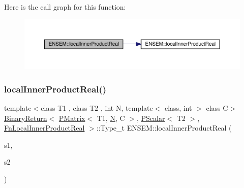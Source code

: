 Here is the call graph for this function\+:\nopagebreak
\begin{figure}[H]
\begin{center}
\leavevmode
\includegraphics[width=350pt]{df/d0a/group__primmatrix_ga512767c96aa10eafdf3b60be8dd2e9bb_cgraph}
\end{center}
\end{figure}
\mbox{\label{group__primmatrix_ga9db3f5557c105ded2a1e426229646f23}} 
\subsubsection{\texorpdfstring{localInnerProductReal()}{localInnerProductReal()}\hspace{0.1cm}{\footnotesize\ttfamily [2/3]}}
{\footnotesize\ttfamily template$<$class T1 , class T2 , int N, template$<$ class, int $>$ class C$>$ \\
\mbox{\hyperlink{structENSEM_1_1BinaryReturn}{Binary\+Return}}$<$ \mbox{\hyperlink{classENSEM_1_1PMatrix}{P\+Matrix}}$<$ T1, \mbox{\hyperlink{operator__name__util_8cc_a7722c8ecbb62d99aee7ce68b1752f337}{N}}, C $>$, \mbox{\hyperlink{classENSEM_1_1PScalar}{P\+Scalar}}$<$ T2 $>$, \mbox{\hyperlink{structENSEM_1_1FnLocalInnerProductReal}{Fn\+Local\+Inner\+Product\+Real}} $>$\+::Type\+\_\+t E\+N\+S\+E\+M\+::local\+Inner\+Product\+Real (\begin{DoxyParamCaption}\item[{const \mbox{\hyperlink{classENSEM_1_1PMatrix}{P\+Matrix}}$<$ T1, \mbox{\hyperlink{operator__name__util_8cc_a7722c8ecbb62d99aee7ce68b1752f337}{N}}, C $>$ \&}]{s1,  }\item[{const \mbox{\hyperlink{classENSEM_1_1PScalar}{P\+Scalar}}$<$ T2 $>$ \&}]{s2 }\end{DoxyParamCaption})\hspace{0.3cm}{\ttfamily [inline]}}

